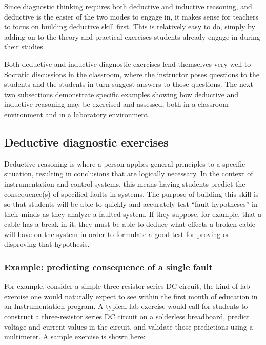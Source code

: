 Since diagnostic thinking requires both deductive and inductive reasoning, and deductive is the easier of the two modes to engage in, it makes sense for teachers to focus on building deductive skill first.  This is relatively easy to do, simply by adding on to the theory and practical exercises students already engage in during their studies.

\vskip 10pt

Both deductive and inductive diagnostic exercises lend themselves very well to Socratic discussions in the classroom, where the instructor poses questions to the students and the students in turn suggest answers to those questions.  The next two subsections demonstrate specific examples showing how deductive and inductive reasoning may be exercised and assessed, both in a classroom environment and in a laboratory environment. 





\filbreak
\subsection{Deductive diagnostic exercises}

Deductive reasoning is where a person applies general principles to a specific situation, resulting in conclusions that are logically necessary.  In the context of instrumentation and control systems, this means having students predict the consequence(s) of specified faults in systems.  The purpose of building this skill is so that students will be able to quickly and accurately test ``fault hypotheses'' in their minds as they analyze a faulted system.  If they suppose, for example, that a cable has a break in it, they must be able to deduce what effects a broken cable will have on the system in order to formulate a good test for proving or disproving that hypothesis.



\filbreak
\subsubsection{Example: predicting consequence of a single fault}

For example, consider a simple three-resistor series DC circuit, the kind of lab exercise one would naturally expect to see within the first month of education in an Instrumentation program.  A typical lab exercise would call for students to construct a three-resistor series DC circuit on a solderless breadboard, predict voltage and current values in the circuit, and validate those predictions using a multimeter.  A sample exercise is shown here:

